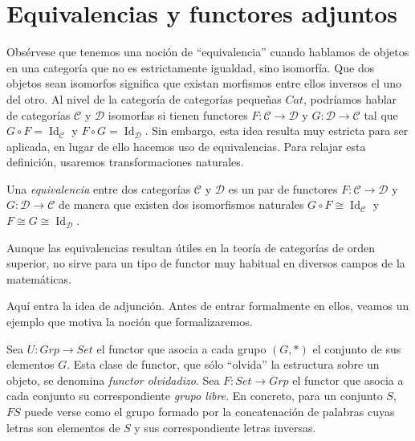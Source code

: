 \documentclass[12pt, twoside]{book}
\newcommand{\newterm}[1]{\index{#1}\emph{#1}}
\newcommand{\cat}{{\mathcal{C}}}
\newcommand{\Set}{{Set}}
\newcommand{\Grp}{{Grp}}
\newcommand{\Cat}{{Cat}}
\newcommand{\sii}{{\ \Leftrightarrow\ }}
\DeclareMathOperator{\Id}{Id}
\begin{document}
\section{Equivalencias y functores adjuntos}\label{functores-adjuntos}
Obsérvese que tenemos una noción de ``equivalencia'' cuando hablamos de objetos en una categoría que no es estrictamente igualdad, sino isomorfía.
Que dos objetos sean isomorfos significa que existan morfismos entre ellos inversos el uno del otro.
Al nivel de la categoría de categorías pequeñas $\Cat$, podríamos hablar de categorías $\cat$ y $\mathcal{D}$ isomorfas si tienen functores $F \colon \cat \to \mathcal{D}$ y $G \colon \mathcal{D} \to \cat$ tal que $G \circ F = \Id_\cat$ y $F \circ G = \Id_\mathcal{D}$.
Sin embargo, esta idea resulta muy estricta para ser aplicada, en lugar de ello hacemos uso de equivalencias.
Para relajar esta definición, usaremos transformaciones naturales.

\begin{definition}
Una \newterm{equivalencia} entre dos categorías $\cat$ y $\mathcal{D}$ es un par de functores $F \colon \cat \to \mathcal{D}$ y $G \colon \mathcal{D} \to \cat$ de manera que existen dos isomorfismos naturales $G \circ F \cong \Id_\cat$ y $F \cong G \cong \Id_\mathcal{D}$.
\end{definition}

Aunque las equivalencias resultan útiles en la teoría de categorías de orden superior, no sirve para un tipo de functor muy habitual en diversos campos de la matemáticas.

Aquí entra la idea de adjunción.
Antes de entrar formalmente en ellos, veamos un ejemplo que motiva la noción que formalizaremos.



Sea $U \colon \Grp \to \Set$ el functor que asocia a cada grupo $(G,*)$ el conjunto de sus elementos $G$.
Esta clase de functor, que sólo ``olvida'' la estructura sobre un objeto, se denomina \emph{functor olvidadizo}.
Sea $F \colon \Set \to \Grp$ el functor que asocia a cada conjunto su correspondiente \newterm{grupo libre}.
En concreto, para un conjunto $S$, $F S$ puede verse como el grupo formado por la concatenación de palabras cuyas letras son elementos de $S$ y sus correspondiente letras inversas.
\end{document}

